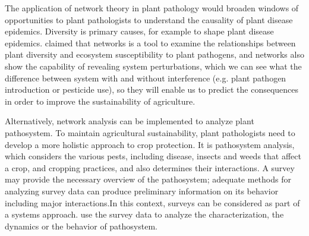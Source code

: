 The application of network theory in plant pathology would broaden windows of opportunities to plant pathologists to understand the causality of plant disease epidemics. Diversity is primary causes, for example to shape plant disease epidemics.  claimed that networks is a tool to examine the relationships between plant diversity and ecosystem susceptibility to plant pathogens, and networks also show the capability of revealing system perturbations, which we can see what the difference between system with and without interference (e.g. plant pathogen introduction or pesticide use), so they will enable us to predict the consequences in order to improve the sustainability of agriculture.

Alternatively, network analysis can be implemented to analyze plant pathosystem. To maintain agricultural sustainability, plant pathologists need to develop a more holistic approach to crop protection. It is pathosystem analysis, which considers the various pests, including disease, insects and weeds that affect a crop, and cropping practices, and also determines their interactions. A survey may provide the necessary overview of the pathosystem; adequate methods for analyzing survey data can produce preliminary information on its behavior including major interactions.In this context, surveys can be considered as part of a systems approach. use the survey data to analyze the characterization, the dynamics or the behavior of pathosystem.

